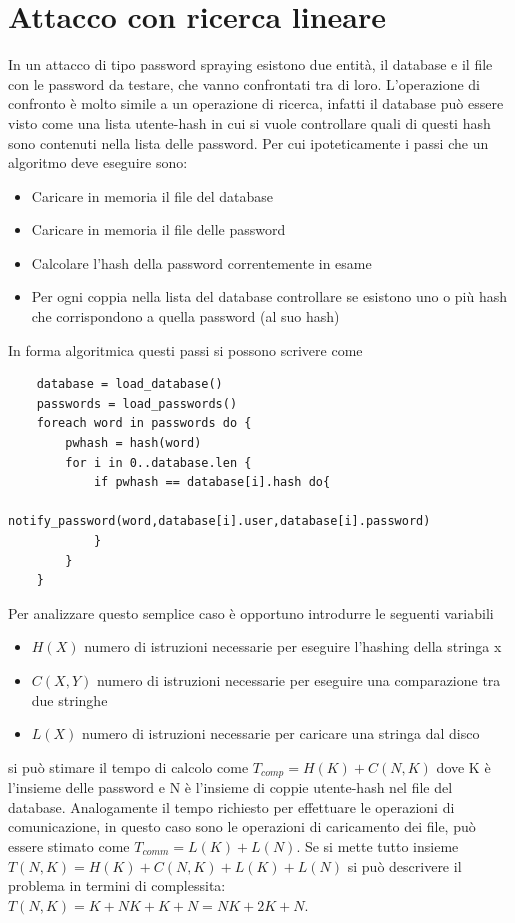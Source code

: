 \section{Attacco con ricerca lineare}

In un attacco di tipo password spraying esistono due entità, il database e il file con le password da testare, che vanno confrontati tra di loro. L'operazione di confronto è molto simile a un operazione di ricerca, infatti il database può essere visto come una lista utente-hash in cui si vuole controllare quali di questi hash sono contenuti nella lista delle password. Per cui ipoteticamente i passi che un algoritmo deve eseguire sono:
\begin{itemize}
    \item Caricare in memoria il file del database 
    \item Caricare in memoria il file delle password
    \item Calcolare l'hash della password correntemente in esame 
    \item Per ogni coppia nella lista del database controllare se esistono uno o più hash che corrispondono a quella password (al suo hash)
\end{itemize} 

In forma algoritmica questi passi si possono scrivere come
\begin{lstlisting}
    database = load_database()
    passwords = load_passwords()
    foreach word in passwords do {
        pwhash = hash(word)
        for i in 0..database.len {
            if pwhash == database[i].hash do{
                notify_password(word,database[i].user,database[i].password)
            }
        }
    }
\end{lstlisting}
Per analizzare questo semplice caso è opportuno introdurre le seguenti variabili
\begin{itemize}
    \item $H(X)$ numero di istruzioni necessarie per eseguire l'hashing della stringa x
    \item $C(X,Y)$ numero di istruzioni necessarie per eseguire una comparazione tra due stringhe 
    \item $L(X)$ numero di istruzioni necessarie per caricare una stringa dal disco 
\end{itemize}

si può stimare il tempo di calcolo come $T_{comp}=H(K)+C(N,K)$ \footnotemark[1] dove K è l'insieme delle password e N è l'insieme di coppie utente-hash nel file del database. Analogamente il tempo richiesto per effettuare le operazioni di comunicazione, in questo caso sono le operazioni di caricamento dei file, può essere stimato come $T_{comm}=L(K) + L(N)$. Se si mette tutto insieme $T(N,K)=H(K)+C(N,K)+L(K)+L(N)$ si può descrivere il problema in termini di complessita:
$T(N,K)=K+NK+K+N=NK + 2K + N$. 

